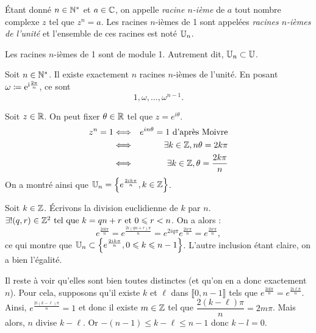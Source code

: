 \documentclass{magnoliaold}
\begin{document}
\begin{definition}[utile=-3]
Étant donné $n\in{\mathbb{N}^*}$ et $a\in\mathbb{C}$, on appelle \emph{racine $n$-ième} de $a$ tout
nombre complexe $z$ tel que $z^n=a$. Les racines $n$-ièmes de 1 sont appelées
\emph{racines $n$-ièmes de l'unité} et l'ensemble de ces racines est noté $\U[n]$.
\end{definition}

\begin{remarqueUnique}
\remarque Les racines $n$-ièmes de 1 sont de module 1. Autrement dit, $\U[n]\subset\U$.
\end{remarqueUnique}



\begin{proposition}[utile=-3]
Soit $n\in{\mathbb{N}^*}$. Il existe exactement $n$ racines $n$-ièmes de l'unité. En posant $\omega\coloneqq{\rm e}^{{\rm i}\frac{2\pi}{n}}$, ce sont
\[1,\omega,\ldots,\omega^{n-1}.\]
\end{proposition}

\begin{preuve}
Soit $z\in\mathbb{R}$. On peut fixer $\theta\in\mathbb{R}$ tel que $z=e^{i\theta}$.
\begin{eqnarray*}
z^n=1 &\Longleftrightarrow& e^{in\theta}=1 \text{ d'après Moivre}\\
&\Longleftrightarrow& \exists k\in \mathbb{Z}, n\theta=2k\pi \\
&\Longleftrightarrow& \exists k\in \mathbb{Z}, \theta=\dfrac{2k\pi}{n}
\end{eqnarray*}
On a montré ainsi que $\U[n]=\ens{e^{\frac{2ik\pi}{n}}, k\in \Z}$.

Soit $k\in \mathbb{Z}$. \'Ecrivons la division euclidienne de $k$ par $n$. $\exists ! (q,r) \in \mathbb{Z}^2 \text{ tel que } k=qn+r \text{ et } 0\leqslant r<n$. On a alors :
\[e^{\frac{2ik\pi}{n}}=e^{\frac{2i(qn+r)\pi}{n}}=e^{2iq\pi}e^{\frac{2ir\pi}{n}}=e^{\frac{2ir\pi}{n}},\]
ce qui montre que $\U[n]\subset\ens{e^{\frac{2ik\pi}{n}}, 0\leq k\leq n-1}$. L'autre inclusion étant claire, on a bien l'égalité.

Il reste à voir qu'elles sont bien toutes distinctes (et qu'on en a donc exactement $n$). Pour cela, supposons qu'il existe $k$ et $\ell$ dans $\llbracket0,n-1\rrbracket$ tels que $e^{\frac{2ik\pi}{n}} =e^{\frac{2i\ell\pi}{n}}$. Ainsi, $e^{\frac{2i(k-\ell)\pi}{n}}=1$ et donc il existe $m\in\mathbb{Z}$ tel que $\dfrac{2(k-\ell)\pi}{n}=2m\pi$. Mais alors, $n$ divise $k-\ell$. Or $-(n-1)\leq k-\ell \leq n-1$ donc $k-l=0$.
\end{preuve}
\end{document}
